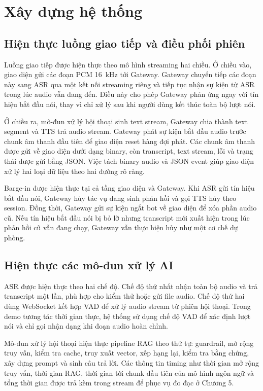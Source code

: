 \documentclass[a4paper,13pt,twoside]{report}
\begin{document}
\section{Xây dựng hệ thống}

\subsection{Hiện thực luồng giao tiếp và điều phối phiên}

Luồng giao tiếp được hiện thực theo mô hình streaming hai chiều. Ở chiều vào, giao diện gửi các đoạn PCM 16~kHz tới Gateway. Gateway chuyển tiếp các đoạn này sang ASR qua một kết nối streaming riêng và tiếp tục nhận sự kiện từ ASR trong lúc audio vẫn đang đến. Điều này cho phép Gateway phản ứng ngay với tín hiệu bắt đầu nói, thay vì chỉ xử lý sau khi người dùng kết thúc toàn bộ lượt nói.

Ở chiều ra, mô-đun xử lý hội thoại sinh text stream, Gateway chia thành text segment và TTS trả audio stream. Gateway phát sự kiện bắt đầu audio trước chunk âm thanh đầu tiên để giao diện reset hàng đợi phát. Các chunk âm thanh được gửi về giao diện dưới dạng binary, còn transcript, text stream, lỗi và trạng thái được gửi bằng JSON. Việc tách binary audio và JSON event giúp giao diện xử lý hai loại dữ liệu theo hai đường rõ ràng.

Barge-in được hiện thực tại cả tầng giao diện và Gateway. Khi ASR gửi tín hiệu bắt đầu nói, Gateway hủy tác vụ đang sinh phản hồi và gọi TTS hủy theo session. Đồng thời, Gateway gửi sự kiện ngắt bot về giao diện để xóa phần audio cũ. Nếu tín hiệu bắt đầu nói bị bỏ lỡ nhưng transcript mới xuất hiện trong lúc phản hồi cũ vẫn đang chạy, Gateway vẫn thực hiện hủy như một cơ chế dự phòng.

\subsection{Hiện thực các mô-đun xử lý AI}

ASR được hiện thực theo hai chế độ. Chế độ thứ nhất nhận toàn bộ audio và trả transcript một lần, phù hợp cho kiểm thử hoặc gửi file audio. Chế độ thứ hai dùng WebSocket kết hợp VAD để xử lý audio stream từ phiên hội thoại. Trong demo tương tác thời gian thực, hệ thống sử dụng chế độ VAD để xác định lượt nói và chỉ gọi nhận dạng khi đoạn audio hoàn chỉnh.

Mô-đun xử lý hội thoại hiện thực pipeline RAG theo thứ tự: guardrail, mở rộng truy vấn, kiểm tra cache, truy xuất vector, xếp hạng lại, kiểm tra bằng chứng, xây dựng prompt và sinh câu trả lời. Các thông tin timing như thời gian mở rộng truy vấn, thời gian RAG, thời gian tới chunk đầu tiên của mô hình ngôn ngữ và tổng thời gian được trả kèm trong stream để phục vụ đo đạc ở Chương 5.
\end{document}
